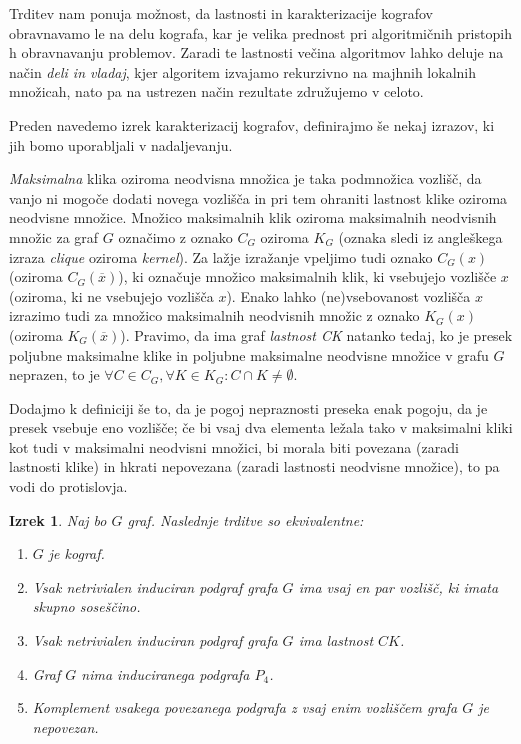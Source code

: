 \documentclass[12pt,a4paper,twoside]{article}
\theoremstyle{definition} %
\theoremstyle{plain} %
\newtheorem{izrek}[definicija]{Izrek}
\numberwithin{equation}{section}  %
\begin{document}
Trditev nam ponuja možnost, da lastnosti in karakterizacije kografov obravnavamo le na delu kografa, kar je velika prednost pri algoritmičnih pristopih h obravnavanju problemov. Zaradi te lastnosti večina algoritmov lahko deluje na način \textit{deli in vladaj}, kjer algoritem izvajamo rekurzivno na majhnih lokalnih množicah, nato pa na ustrezen način rezultate združujemo v celoto.


\medskip
Preden navedemo izrek karakterizacij kografov, definirajmo še nekaj izrazov, ki jih bomo uporabljali v nadaljevanju.

\emph{Maksimalna} klika oziroma neodvisna množica je taka podmnožica vozlišč, da vanjo ni mogoče dodati novega vozlišča in pri tem ohraniti lastnost klike oziroma neodvisne množice. Množico maksimalnih klik oziroma maksimalnih neodvisnih množic za graf $G$ označimo z oznako $\mathit{C_G}$ oziroma $\mathit{K_G}$ (oznaka sledi iz angleškega izraza \emph{clique} oziroma \emph{kernel}). Za lažje izražanje vpeljimo tudi oznako $\mathit{C_G(x)}$ (oziroma $\mathit{C_G(\overline{x})}$), ki označuje množico maksimalnih klik, ki vsebujejo vozlišče $x$ (oziroma, ki ne vsebujejo vozlišča $x$). Enako lahko (ne)vsebovanost vozlišča $x$ izrazimo tudi za množico maksimalnih neodvisnih množic z oznako $\mathit{K_G(x)}$ (oziroma $\mathit{K_G(\overline{x})}$). Pravimo, da ima graf \emph{lastnost CK}  natanko tedaj, ko je presek poljubne maksimalne klike in poljubne maksimalne neodvisne množice v grafu $G$ neprazen, to je $\forall C\in \mathit{C_G}, \forall K \in \mathit{K_G} :C \cap K \neq \emptyset$.

Dodajmo k definiciji še to, da je pogoj nepraznosti preseka enak pogoju, da je presek vsebuje eno vozlišče; če bi vsaj dva elementa ležala tako v maksimalni kliki kot tudi v maksimalni neodvisni množici, bi morala biti povezana (zaradi lastnosti klike) in hkrati nepovezana (zaradi lastnosti neodvisne množice), to pa vodi do protislovja.
\begin{izrek}\label{karakterizacija}
Naj bo $G$ graf. Naslednje trditve so ekvivalentne:
\begin{enumerate}[label=(\roman*)]
\item $G$ je kograf.
\item Vsak netrivialen induciran podgraf grafa $G$ ima vsaj en par vozlišč, ki imata skupno soseščino.
\item Vsak netrivialen induciran podgraf grafa $G$ ima lastnost $CK$.
\item Graf $G$ nima induciranega podgrafa $P_4$.
\item Komplement vsakega povezanega podgrafa z vsaj enim vozliščem grafa $G$ je nepovezan.
\end{enumerate}
\end{izrek}
\end{document}
